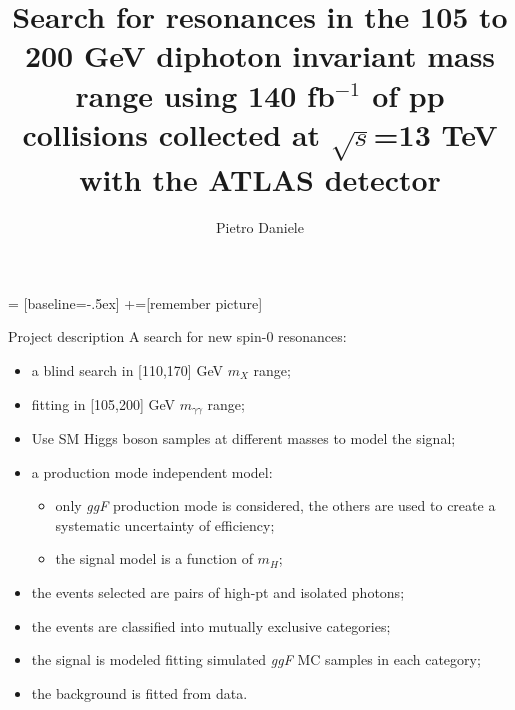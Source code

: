 \documentclass[10pt,UKenglish, leqno, xcolor = dvipsnames]{beamer}
\author{Pietro Daniele}
\title{\large Search for resonances in the 105 to 200 GeV diphoton invariant mass range using 140 fb$^{-1}$ of pp collisions collected at $\sqrt{s}$=13 TeV with the ATLAS detector}
\begin{document}
	 = [baseline=-.5ex]
	+=[remember picture]
	
	\begin{frame}{Project description}
		\vfill
		A search for new spin-0 resonances:
		\begin{itemize}
			\item a blind search in [110,170] GeV $m_{X}$ range;
			\item fitting in [105,200] GeV $m_{\gamma\gamma}$ range;
			\item Use SM Higgs boson samples at different masses to model the signal;
			\item a production mode independent model:
			\begin{itemize}
				\item only \textit{ggF} production mode is considered, the others are used to create a systematic uncertainty of efficiency;
				\item the signal model is a function of $m_H$;
			\end{itemize} 
			\item the events selected are pairs of high-pt and isolated photons; 
			\item the events are classified into mutually exclusive categories;
			\item the signal is modeled fitting simulated \textit{ggF} MC samples in each category;
			\item the background is fitted from data.
		\end{itemize}
		\vfill
	\end{frame}
\end{document}
